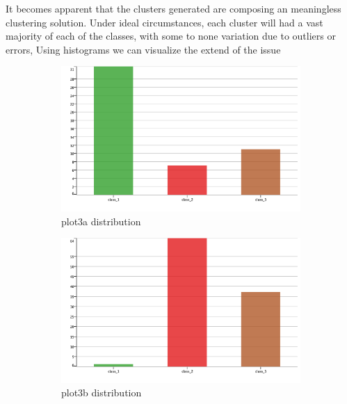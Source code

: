 \documentclass[11pt]{article}
\begin{document}
		 	\fi
			It becomes apparent that the clusters generated are composing an meaningless clustering solution. Under ideal circumstances, each cluster will had a vast majority of each of the classes, with some to none variation due to outliers or errors, Using histograms we can visualize the extend of the issue 
			\iftrue
			\begin{figure}[H]
				\centering
				\begin{subfigure}{0.4\textwidth}
			 		\includegraphics[width=\textwidth]{res/t1/t14/t14-plota-dist}
					\caption{plot3a distribution}
					\label{fig:first}
				\end{subfigure}
				\hfill
				\begin{subfigure}{0.4\textwidth}
			 		\includegraphics[width=\textwidth]{res/t1/t14/t14-plotb-dist}
					\caption{plot3b distribution}
					\label{fig:second}
				\end{subfigure}
				\hfill
				\begin{subfigure}{0.4\textwidth}

\end{subfigure}
\end{figure}
\end{document}

